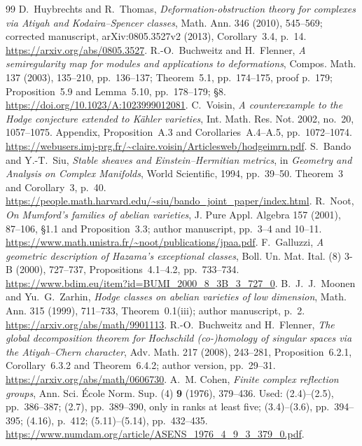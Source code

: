 \documentclass[11pt]{article}
\theoremstyle{definition}
\theoremstyle{remark}
\begin{document}
\begin{thebibliography}{99}
 D.~Huybrechts and R.~Thomas, \emph{Deformation-obstruction theory for complexes via Atiyah and Kodaira--Spencer classes}, Math. Ann. 346 (2010), 545--569; corrected manuscript, arXiv:0805.3527v2 (2013), Corollary~3.4, p.~14. \url{https://arxiv.org/abs/0805.3527}.
 R.-O.~Buchweitz and H.~Flenner, \emph{A semiregularity map for modules and applications to deformations}, Compos. Math. 137 (2003), 135--210, pp.~136--137; Theorem~5.1, pp.~174--175, proof p.~179; Proposition~5.9 and Lemma~5.10, pp.~178--179; \S8. \url{https://doi.org/10.1023/A:1023999012081}.
 C.~Voisin, \emph{A counterexample to the Hodge conjecture extended to Kähler varieties}, Int. Math. Res. Not. 2002, no.~20, 1057--1075. Appendix, Proposition~A.3 and Corollaries~A.4--A.5, pp.~1072--1074. \url{https://webusers.imj-prg.fr/~claire.voisin/Articlesweb/hodgeimrn.pdf}.
 S.~Bando and Y.-T.~Siu, \emph{Stable sheaves and Einstein--Hermitian metrics}, in \emph{Geometry and Analysis on Complex Manifolds}, World Scientific, 1994, pp.~39--50. Theorem~3 and Corollary~3, p.~40. \url{https://people.math.harvard.edu/~siu/bando_joint_paper/index.html}.
 R.~Noot, \emph{On Mumford's families of abelian varieties}, J. Pure Appl. Algebra 157 (2001), 87--106, \S1.1 and Proposition~3.3; author manuscript, pp.~3--4 and 10--11. \url{https://www.math.unistra.fr/~noot/publications/jpaa.pdf}.
 F.~Galluzzi, \emph{A geometric description of Hazama's exceptional classes}, Boll. Un. Mat. Ital. (8) 3-B (2000), 727--737, Propositions~4.1--4.2, pp.~733--734. \url{https://www.bdim.eu/item?id=BUMI_2000_8_3B_3_727_0}.
 B.~J.~J.~Moonen and Yu.~G.~Zarhin, \emph{Hodge classes on abelian varieties of low dimension}, Math. Ann. 315 (1999), 711--733, Theorem~0.1(iii); author manuscript, p.~2. \url{https://arxiv.org/abs/math/9901113}.
 R.-O.~Buchweitz and H.~Flenner, \emph{The global decomposition theorem for Hochschild (co-)homology of singular spaces via the Atiyah--Chern character}, Adv. Math. 217 (2008), 243--281, Proposition~6.2.1, Corollary~6.3.2 and Theorem~6.4.2; author version, pp.~29--31. \url{https://arxiv.org/abs/math/0606730}.
A.~M. Cohen, \emph{Finite complex reflection groups},
Ann. Sci. \'Ecole Norm. Sup. (4) \textbf{9} (1976), 379--436.
Used: (2.4)--(2.5), pp.~386--387; (2.7), pp.~389--390,
only in ranks at least five; (3.4)--(3.6), pp.~394--395;
(4.16), p.~412; (5.11)--(5.14), pp.~432--435.
\url{https://www.numdam.org/article/ASENS_1976_4_9_3_379_0.pdf}.


\end{thebibliography}
\end{document}
